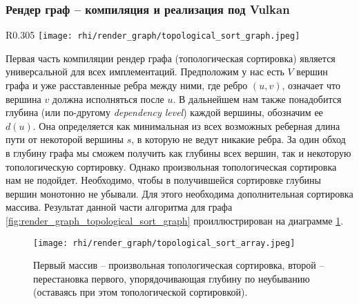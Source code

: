 \subsubsection{Рендер граф -- компиляция и реализация под Vulkan}

\begin{wrapfigure}{R}{0.305\textwidth}
    \centering
    \texttt{[image: rhi/render\_graph/topological\_sort\_graph.jpeg]} 
    \caption{Граф зависимостей.}
    \label{fig:render_graph_topological_sort_graph}
\end{wrapfigure}

Первая часть компиляции рендер графа (топологическая сортировка) является универсальной для всех имплементаций. Предположим у нас есть $V$ вершин графа и уже расставленные ребра между ними, где ребро $(u, v)$, означает что вершина $v$ должна исполняться после $u$. В дальнейшем нам также понадобится глубина (или по-другому \textit{dependency level}) каждой вершины, обозначим ее $d(u)$. Она определяется как минимальная из всех возможных реберная длина пути от некоторой вершины $s$, в которую не ведут никакие ребра. За один обход в глубину графа мы сможем получить как глубины всех вершин, так и некоторую топологическую сортировку. Однако произвольная топологическая сортировка нам не подойдет. Необходимо, чтобы в получившейся сортировке глубины вершин монотонно не убывали. Для этого необходима дополнительная сортировка массива. Результат данной части алгоритма для графа \ref{fig:render_graph_topological_sort_graph} проиллюстрирован на диаграмме \ref{fig:render_graph_topological_sort_arrays}.

\begin{figure}[h]
    \centering
    \texttt{[image: rhi/render\_graph/topological\_sort\_array.jpeg]}
    \caption{Первый массив -- произвольная топологическая сортировка, второй -- перестановка первого, упорядочивающая глубину по неубыванию (оставаясь при этом топологической сортировкой).}
    \label{fig:render_graph_topological_sort_arrays}
\end{figure}



